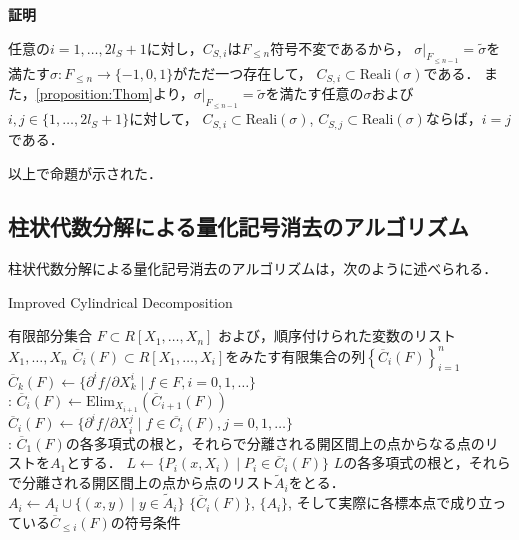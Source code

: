 \documentclass[uplatex, dvipdfmx]{jsarticle}
\makeatletter
\numberwithin{equation}{section}
\renewenvironment{proof}[1][\proofname]{\par
  \pushQED{\qed}%
  \normalfont \topsep6\p@\@plus6\p@\relax
  \trivlist
  \item\relax
  {\bfseries
  #1\@addpunct{.}}\hspace\labelsep\ignorespaces
}{
  \popQED\endtrivlist\@endpefalse
}
\newcommand{\Elim}{\mathrm{Elim}}
\newcommand{\Reali}{\mathrm{Reali}}
\newcommand{\map}[3]{{#1}\colon{#2}\rightarrow{#3}}
\theoremstyle{definition}
\renewcommand{\proofname}{\textbf{証明}}
\makeatother
\begin{document}
\begin{proof}
     任意の$i=1, \dots, 2l_S+1$に対し，$C_{S,i}$は$F_{\leq n}$符号不変であるから，
     $\sigma|_{F_{\leq n-1}} = \widetilde{\sigma}$を満たす$\map{\sigma}{F_{\leq n}}{\{-1,0,1\}}$がただ一つ存在して，
     $C_{S,i} \subset \Reali(\sigma)$である．
     また，\cref{proposition:Thom}より，$\sigma|_{F_{\leq n-1}} = \widetilde{\sigma}$を満たす任意の$\sigma$および
     $i,j \in \{1, \dots, 2l_S + 1\}$に対して，
     $C_{S,i} \subset \Reali(\sigma)$, $C_{S,j} \subset \Reali(\sigma)$ならば，$i=j$である．

     以上で命題が示された．
\end{proof}

\subsection{柱状代数分解による量化記号消去のアルゴリズム}

柱状代数分解による量化記号消去のアルゴリズムは，次のように述べられる．

\begin{algorithm}
     \caption{Improved Cylindrical Decomposition}
     \begin{algorithmic}[1]
          \REQUIRE 
               有限部分集合
               $F \subset R[X_1, \dots, X_n]$
               および，順序付けられた変数のリスト$X_1, \dots, X_n$
          \ENSURE
               $\overline{C}_i(F) \subset R[X_1, \dots, X_i]$をみたす有限集合の列$\left\{\overline{C}_i(F)\right\}_{i=1}^n$
          \STATE $\overline{C}_k(F)\leftarrow \{\partial^i f/ \partial X_k^i \mid f \in F, i=0,1,\dots \}$
          \\ :
               \STATE $\overline{C}_i(F) \leftarrow \Elim_{X_{i+1}}(\overline{C}_{i+1}(F))$
               \STATE $\overline{C}_i(F) \leftarrow \{ \partial^i f/ \partial X_i^j \mid f \in  \overline{C_i}(F), j=0,1, \dots\}$
          \ENDFOR
          \\ :
          \STATE $\overline{C}_1(F)$の各多項式の根と，それらで分離される開区間上の点からなる点のリストを$A_1$とする．
                    \STATE $L \leftarrow \{P_i(x, X_i) \mid P_i \in \overline{C}_i(F)\}$
                    \STATE $L$の各多項式の根と，それらで分離される開区間上の点から点のリスト$\widetilde{A}_i$をとる．
                    \STATE $A_i \leftarrow A_i \cup \{(x, y)\mid y \in \widetilde{A}_i\}$
               \ENDFOR
          \ENDFOR
          \RETURN $\{\overline{C}_i(F)\}$, $\{A_i\}$, そして実際に各標本点で成り立っている$\overline{C}_{\leq i}(F)$の符号条件
     \end{algorithmic}
\end{algorithm}
\end{document}
